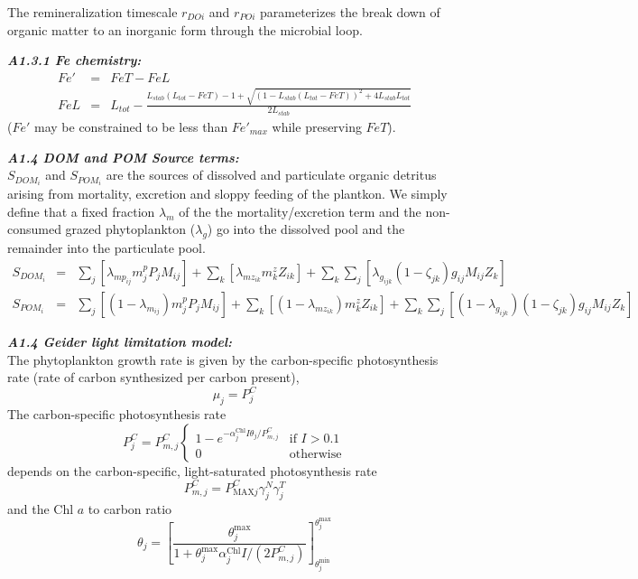 \documentclass[11pt,letterpaper,english]{article}
\begin{document}
The remineralization timescale $r_{DOi}$ and $r_{POi}$ parameterizes the break
down of organic matter to an inorganic form through the microbial loop.


{\it {\bf A1.3.1 Fe chemistry:}}\\
\begin{eqnarray}
Fe' & = & FeT - FeL \nonumber \\
FeL & = & L_{tot} -
  \frac{ L_{stab} (L_{tot} - FeT) - 1
        +\sqrt{(1 - L_{stab} (L_{tot} - FeT))^2 + 4 L_{stab} L_{tot}}}
     {2 L_{stab}} \nonumber
\end{eqnarray}
($Fe'$ may be constrained to be less than $Fe'_{max}$ while preserving $FeT$).

 
{\it {\bf A1.4 DOM and POM Source terms:}}\\
$S_{DOM_i}$ and $S_{POM_i}$ are the sources of dissolved and particulate
organic detritus arising from mortality, excretion and sloppy feeding of the
plantkon. We simply define that a fixed fraction $\lambda_m$ of the the
mortality/excretion term and the non-consumed grazed phytoplankton
($\lambda_g$) go into the dissolved pool and the remainder into the particulate
pool. 
\begin{eqnarray}
S_{DOM_i} & = & \sum_{j} [\lambda_{mp_{ij}} m^p_j P_j M_{ij}] 
             + \sum_{k} [\lambda_{mz_{ik}} m^z_k Z_{ik}]
             + \sum_{k} \sum_{j} [\lambda_{g_{ijk}} (1-\zeta_{jk})
                                        g_{ij} M_{ij} Z_k ]
\nonumber \\
S_{POM_i} & = & \sum_{j} [(1-\lambda_{m_{ij}}) m^p_j P_j M_{ij}]
             + \sum_{k} [(1-\lambda_{mz_{ik}}) m^z_k Z_{ik}]
             + \sum_{k} \sum_{j} [(1-\lambda_{g_{ijk}}) (1-\zeta_{jk})  
                                       g_{ij} M_{ij} Z_k ]
\nonumber
\end{eqnarray}


\newcommand{\pcm}[1]{P^C_{m#1}}
\newcommand{\pcmax}[1]{P^C_{\textrm{MAX}#1}}
\newcommand{\pcarbon}{P^C}
\newcommand{\chltoc}{\theta}
\newcommand{\chltocmax}{\theta^{\textrm{max}}}
\newcommand{\chltocmin}{\theta^{\textrm{min}}}
\newcommand{\alphachl}{\alpha^{\textrm{Chl}}}
\newcommand{\mQyield}{\mathit{mQ}^{\textrm{yield}}}
\newcommand{\RPC}{R^{PC}}
\newcommand{\phychl}{\mathit{Chl}}
\newcommand{\aphychlave}{A^{\mathrm{phy}}_{\mathrm{Chl,ave}}}

{\it {\bf A1.4 Geider light limitation model:}}\\
The phytoplankton growth rate is given by the carbon-specific photosynthesis rate
(rate of carbon synthesized per carbon present),
\[
  \mu_j = \pcarbon_j
\]
The carbon-specific photosynthesis rate
\[
  \pcarbon_j = \pcm{,j} \begin{cases}
     1 - e^{-\alphachl_j I \chltoc_j/\pcm{,j}} & \text{if }I>0.1 \\
     0                                         & \text{otherwise}
   \end{cases}
\]
depends on the carbon-specific, light-saturated photosynthesis rate
\[
  \pcm{,j}=\pcmax{j} \gamma^N_j \gamma^T_j
\]
and the Chl $a$ to carbon ratio
\[
  \chltoc_j = \left[ \frac{\chltocmax_j}
                   {1 + \chltocmax_j \alphachl_j I / (2 \pcm{,j})}
		   \right]^{\chltocmax_j}_{\chltocmin_j}
\]
\end{document}
